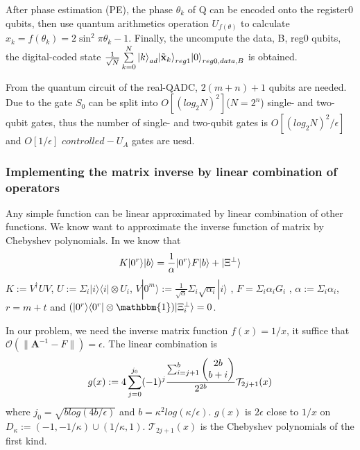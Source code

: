 \documentclass[%
 reprint,
 amsmath,amssymb,
pra,
]{revtex4-1}
\begin{document}
After phase estimation (PE), the phase ${\theta _k}$ of Q can be encoded onto the register0 qubits, then use quantum arithmetics operation ${U_{f\left( \theta  \right)}}$ to calculate
${x_k} = f\left( {{\theta _k}} \right) = 2{\sin ^2}\pi {\theta _k} - 1$.
Finally, the uncompute the data, B, reg0 qubits, the digital-coded state
$\frac{1}{{\sqrt N }}\sum\limits_{k = 0}^N {{{\left| k \right\rangle }_{ad}}{{\left| {{{\tilde {\textbf x}}_k}} \right\rangle }_{reg1}}{{\left| 0 \right\rangle }_{reg0,data,B}}} $
is obtained.


From the quantum circuit of the real-QADC, $2(m+n)+1$ qubits are needed. Due to the gate $S_0$ can be split into $O[(log_{2}N)^2]$($N=2^n$) 
single- and two-qubit gates\cite{barenco_elementary_1995}, thus the number of single- and two-qubit gates is $O[(log_{2}N)^2/{\epsilon}]$ and $O[1/{\epsilon}]$ $controlled-U_A$ gates are uesd\cite{mitarai2019quantum}.


\subsubsection{Implementing the matrix inverse by linear combination of operators}
Any simple function can be linear approximated by linear combination of other
functions. We know want to approximate the inverse function of matrix by
Chebyshev polynomials. In \cite{Childs2017Quantum} we know that 
\begin{equation}
\label{K}
K|0^r\rangle|b\rangle=\frac{1}{\alpha}|0^r\rangle F|b\rangle
+|\Xi^\bot \rangle\notag
\end{equation}
$K:=V^\dagger UV$, $U:=\Sigma_i|i\rangle\langle i|
\otimes U_i$, 
$V|0^m\rangle:=\frac{1}{\sqrt{\alpha}}\Sigma_i\sqrt{\alpha_i}|i\rangle$
, $F=\Sigma_i\alpha_iG_i$
, $\alpha:=\Sigma_i\alpha_i$, $r=m+t$ and 
$(|0^r\rangle\langle0^r|\otimes\mathbbm{1})|\Xi_i^\bot\rangle=0$.

In our problem, we need the inverse matrix function $f(x) = 1/x$, 
it suffice that $\mathcal{O}(\lVert \bm{A}^{-1}-F\rVert)=\epsilon$.
The linear combination\cite{Childs2017Quantum} is
\begin{equation}
g(x):=4\sum_{j=0}^{j_0}(-1)^j
\frac{\sum_{i=j+1}^{b}\begin{pmatrix}
2b\\b+i
\end{pmatrix}}{2^{2b}}\mathcal{T}_{2j+1}(x)\notag
\end{equation}
where $j_0=\sqrt{b log(4b/\epsilon)}$ and $b=\kappa^2log(\kappa/\epsilon)$.
$g(x)$ is $2\epsilon$ close to $1/x$ on $D_\kappa:=(-1,-1/\kappa)\cup
(1/\kappa,1)$.
$\mathcal{T}_{2j+1}(x)$ is the Chebyshev polynomials of the first kind.
\end{document}
